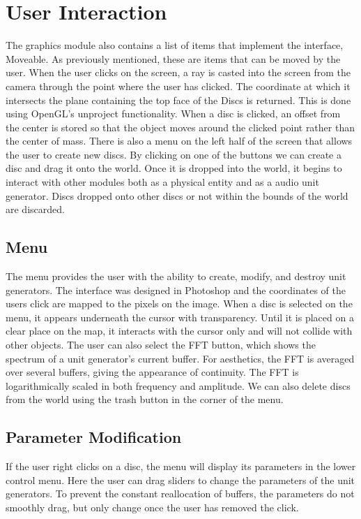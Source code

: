 \documentclass[pdftext,twoside,10pt]{article}
\begin{document}
\section{User Interaction}
The graphics module also contains a list of items that implement the interface, Moveable. As previously mentioned, these are items that can be moved by the user. When the user clicks on the screen, a ray is casted into the screen from the camera through the point where the user has clicked. The coordinate at which it intersects the plane containing the top face of the Discs is returned. This is done using OpenGL's unproject functionality. When a disc is clicked, an offset from the center is stored so that the object moves around the clicked point rather than the center of mass. There is also a menu on the left half of the screen that allows the user to create new discs. By clicking on one of the buttons we can create a disc and drag it onto the world. Once it is dropped into the world, it begins to interact with other modules both as a physical entity and as a audio unit generator. Discs dropped onto other discs or not within the bounds of the world are discarded.

\subsection{Menu}
The menu provides the user with the ability to create, modify, and destroy unit generators. The interface was designed in Photoshop and the coordinates of the users click are mapped to the pixels on the image. When a disc is selected on the menu, it appears underneath the cursor with transparency. Until it is placed on a clear place on the map, it interacts with the cursor only and will not collide with other objects. The user can also select the FFT button, which shows the spectrum of a unit generator's current buffer. For aesthetics, the FFT is averaged over several buffers, giving the appearance of continuity. The FFT is logarithmically scaled in both frequency and amplitude. We can also delete discs from the world using the trash button in the corner of the menu.

\subsection{Parameter Modification}
If the user right clicks on a disc, the menu will display its parameters in the lower control menu. Here the user can drag sliders to change the parameters of the unit generators. To prevent the constant reallocation of buffers, the parameters do not smoothly drag, but only change once the user has removed the click.
\end{document}
